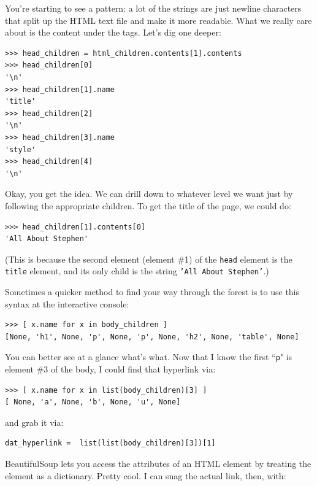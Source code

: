 \documentclass[12pt]{article}
\begin{document}
You're starting to see a pattern: a lot of the strings are just newline
characters that split up the HTML text file and make it more readable. What we
really care about is the content under the tags. Let's dig one deeper:

\begin{Verbatim}[fontsize=\small,samepage=true,frame=none]
>>> head_children = html_children.contents[1].contents
>>> head_children[0]
'\n'
>>> head_children[1].name
'title'
>>> head_children[2]
'\n'
>>> head_children[3].name
'style'
>>> head_children[4]
'\n'
\end{Verbatim}

    Okay, you get the idea. We can drill down to whatever level we want just
by following the appropriate children. To get the title of the page, we could
do:

\begin{Verbatim}[fontsize=\small,samepage=true,frame=none]
>>> head_children[1].contents[0]
'All About Stephen'
\end{Verbatim}

(This is because the second element (element \#1) of the \texttt{head} element
is the \texttt{title} element, and its only child is the string \texttt{'All
About Stephen'}.)

Sometimes a quicker method to find your way through the forest is to use this
syntax at the interactive console:

\begin{Verbatim}[fontsize=\small,samepage=true,frame=none]
>>> [ x.name for x in body_children ]
[None, 'h1', None, 'p', None, 'p', None, 'h2', None, 'table', None]
\end{Verbatim}

You can better see at a glance what's what. Now that I know the first
``\texttt{p}" is element \#3 of the body, I could find that hyperlink via:

\begin{Verbatim}[fontsize=\small,samepage=true,frame=none]
>>> [ x.name for x in list(body_children)[3] ]
[ None, 'a', None, 'b', None, 'u', None]
\end{Verbatim}

and grab it via:

\begin{Verbatim}[fontsize=\small,samepage=true,frame=none]
dat_hyperlink =  list(list(body_children)[3])[1]
\end{Verbatim}

BeautifulSoup lets you access the attributes of an HTML element by treating
the element as a dictionary. Pretty cool. I can snag the actual link, then,
with:
\end{document}
